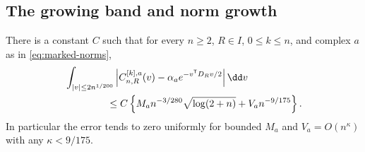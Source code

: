 \subsection{The growing band and norm growth}
\begin{theorem}
\label{thm:marked-return-band}
There is a constant $C$ such that for every $n\ge2$, $R\in I$,
$0\le k\le n$, and complex $a$ as in \eqref{eq:marked-norms},
\begin{align}
 &\int_{|v|\le2n^{1/200}}
   \left|C^{[k],a}_{n,R}(v)-\alpha_a e^{-v^{\mathsf T}D_Rv/2}\right|\dd v
      \notag\\
 &\hspace{15mm}\le C\left\{
 M_an^{-3/280}\sqrt{\log(2+n)}+V_an^{-9/175}\right\}.
      \label{eq:marked-return-band}
\end{align}
In particular the error tends to zero uniformly for bounded $M_a$ and
$V_a=O(n^\kappa)$ with any $\kappa<9/175$.
\end{theorem}
